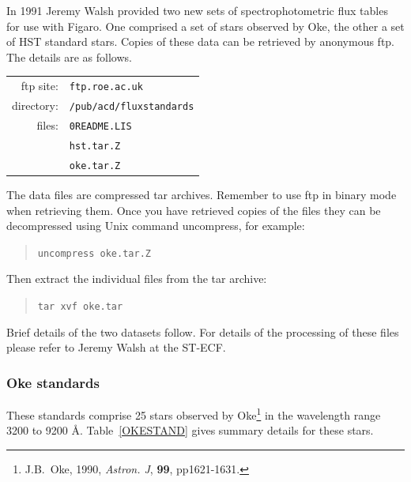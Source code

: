 \documentclass[11pt,twoside]{article}
\begin{document}
   In 1991 Jeremy Walsh provided two new sets of spectrophotometric flux
   tables for use with Figaro.  One comprised a set of stars observed by
   Oke, the other a set of HST standard stars.  Copies of these data can
   be retrieved by anonymous ftp.  The details are as follows.

\begin{center}
\begin{tabular}{rl}
ftp site:  & {\tt ftp.roe.ac.uk} \\
directory: & {\tt  /pub/acd/fluxstandards} \\
files:     & {\tt  0README.LIS}  \\
           & {\tt  hst.tar.Z}    \\
           & {\tt  oke.tar.Z}    \\
\end{tabular}
\end{center}

   The data files are compressed tar archives.  Remember to use ftp in
   binary mode when retrieving them.  Once you have retrieved copies of
   the files they can be decompressed using Unix command uncompress, for
   example:

\begin{quote}
{\tt uncompress oke.tar.Z}
\end{quote}

   Then extract the individual files from the tar archive:

\begin{quote}
{\tt tar xvf oke.tar}
\end{quote}

   Brief details of the two datasets follow.  For details of the processing
   of these files please refer to Jeremy Walsh at the ST-ECF.

\subsubsection{Oke standards}

   These standards comprise 25 stars observed by Oke\footnote{J.B.~Oke,
   1990, {\it Astron. J}, {\bf 99}, pp1621-1631.} in the wavelength range
   3200 to 9200 \AA .  Table~\ref{OKESTAND} gives summary details for these
   stars.
\end{document}
